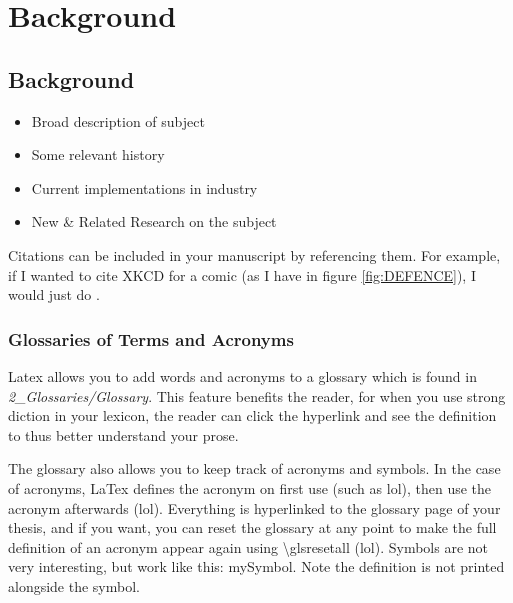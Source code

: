 
\glsresetall %
\chapter[Background]{Background}\label{ch:Background}

\section{Background}
\begin{itemize}
	\item{Broad description of subject}
	\item{Some relevant history}
	\item{Current implementations in industry}
	\item{New \& Related Research on the subject}
\end{itemize}

Citations can be included in your manuscript by referencing them. For example, if I wanted to cite XKCD for a comic (as I have in figure \ref{fig:DEFENCE}), I would just do \cite{xkcdThesis}.

\subsection[Glossaries]{Glossaries of Terms and Acronyms}

Latex allows you to add words and acronyms to a glossary which is found in \textit{2\_Glossaries/Glossary}. This feature benefits the reader, for when you use strong \gls{diction} in your \gls{lexicon}, the reader can click the hyperlink and see the definition to thus better understand your \gls{prose}.

The glossary also allows you to keep track of acronyms and symbols. In the case of acronyms, LaTex defines the acronym on first use (such as \gls{lol}), then use the acronym afterwards (\gls{lol}). 
\glsresetall %
Everything is hyperlinked to the glossary page of your thesis, and if you want, you can reset the glossary at any point to make the full definition of an acronym appear again using \textbackslash glsresetall (\gls{lol}). Symbols are not very interesting, but work like this: \gls{mySymbol}. Note the definition is not printed alongside the symbol.